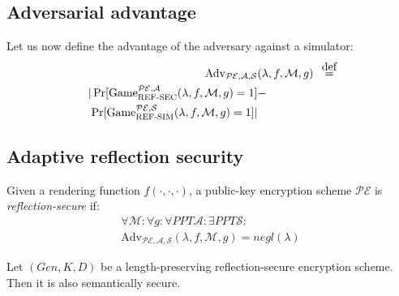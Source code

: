 \subsection{Adversarial advantage}\label{subsec:refsecadv}

Let us now define the advantage of the adversary against a simulator:
\begin{align*}
    \text{Adv}_{\mathcal{PE}, \mathcal{A}, \mathcal{S}}&(\lambda, f, \mathcal{M}, g) &\defeq\\
    |\Pr[\text{Game}_{\text{REF-SEC}}^{\mathcal{PE},\mathcal{A}}(\lambda, f, \mathcal{M}, g) = 1] &-\\
    \Pr[\text{Game}_{\text{REF-SIM}}^{\mathcal{PE},\mathcal{S}}(\lambda, f, \mathcal{M}, g) = 1]| &
\end{align*}

\subsection{Adaptive reflection security}\label{subsec:adaptiverefsec}

Given a rendering function $f(\cdot, \cdot, \cdot)$, a public-key encryption
scheme $\mathcal{PE}$ is \textit{reflection-secure} if:
\begin{align*}
    \forall \mathcal{M}:
    \forall g:
    \forall PPT \mathcal{A}:
    \exists PPT \mathcal{S}:\\
    \text{Adv}_{\mathcal{PE}, \mathcal{A}, \mathcal{S}}(\lambda, f, \mathcal{M}, g) = negl(\lambda)
\end{align*}

\begin{lemma}
    Let $(Gen, K, D)$ be a length-preserving reflection-secure encryption
    scheme. Then it is also semantically secure.
\end{lemma}

